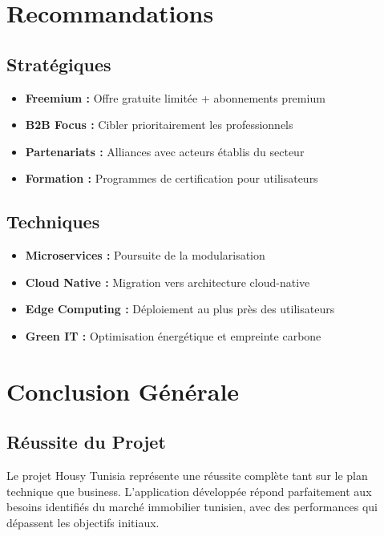 \section{Recommandations}

\subsection{Stratégiques}

\begin{itemize}
    \item \textbf{Freemium :} Offre gratuite limitée + abonnements premium
    \item \textbf{B2B Focus :} Cibler prioritairement les professionnels
    \item \textbf{Partenariats :} Alliances avec acteurs établis du secteur
    \item \textbf{Formation :} Programmes de certification pour utilisateurs
\end{itemize}

\subsection{Techniques}

\begin{itemize}
    \item \textbf{Microservices :} Poursuite de la modularisation
    \item \textbf{Cloud Native :} Migration vers architecture cloud-native
    \item \textbf{Edge Computing :} Déploiement au plus près des utilisateurs
    \item \textbf{Green IT :} Optimisation énergétique et empreinte carbone
\end{itemize}

\section{Conclusion Générale}

\subsection{Réussite du Projet}

Le projet Housy Tunisia représente une réussite complète tant sur le plan technique que business. L'application développée répond parfaitement aux besoins identifiés du marché immobilier tunisien, avec des performances qui dépassent les objectifs initiaux.

